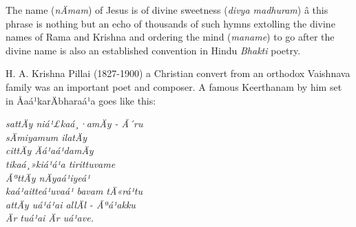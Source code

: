 The name (\textit{nÄmam}) of Jesus is of divine sweetness (\textit{divya madhuram}) â this phrase is nothing but an echo of thousands of such hymns extolling the divine names of Rama and Krishna and ordering the mind (\textit{maname}) to go after the divine name is also an established convention in Hindu \textit{Bhakti} poetry.

\newpage

H. A. Krishna Pillai (1827-1900) a Christian convert from an orthodox Vaishnava family was an important poet and composer. A famous Keerthanam by him set in Åaá¹karÄbharaá¹a goes like this:

\begin{myquote}
\hspace{2cm}\textit{sattÄy niá¹£kaá¸·amÄy - Ã´ru\\\hspace{2cm} sÄmiyamum ilatÄy \\\hspace{2cm} cittÄy Äá¹aá¹damÄy\\ tikaá¸»kiá¹á¹a tirittuvame\\\hspace{2cm} ÃªttÄy nÄyaá¹­iyeá¹\\ kaá¹­aitteá¹uvaá¹ bavam tÄ«rá¹tu\\\hspace{2cm} attÄy uá¹á¹ai allÄl - Ãªá¹akku\\\hspace{2cm} Är tuá¹ai Är uá¹ave.}
\end{myquote}

\begin{myquote}
\hspace{2cm}
\end{myquote}

